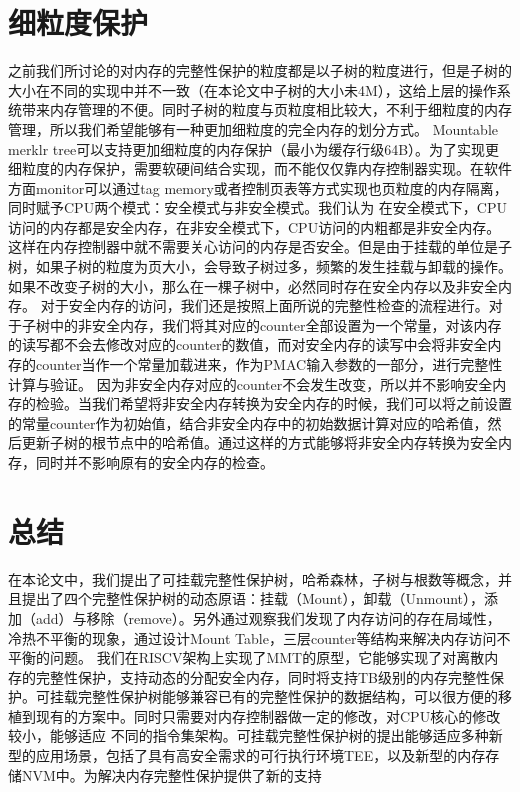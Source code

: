 \section{细粒度保护}
之前我们所讨论的对内存的完整性保护的粒度都是以子树的粒度进行，但是子树的大小在不同的实现中并不一致（在本论文中子树的大小未4M），这给上层的操作系统带来内存管理的不便。同时子树的粒度与页粒度相比较大，不利于细粒度的内存管理，所以我们希望能够有一种更加细粒度的完全内存的划分方式。
Mountable merklr tree可以支持更加细粒度的内存保护（最小为缓存行级64B）。为了实现更细粒度的内存保护，需要软硬间结合实现，而不能仅仅靠内存控制器实现。在软件方面monitor可以通过tag memory或者控制页表等方式实现也页粒度的内存隔离，同时赋予CPU两个模式：安全模式与非安全模式。我们认为
在安全模式下，CPU访问的内存都是安全内存，在非安全模式下，CPU访问的内粗都是非安全内存。这样在内存控制器中就不需要关心访问的内存是否安全。但是由于挂载的单位是子树，如果子树的粒度为页大小，会导致子树过多，频繁的发生挂载与卸载的操作。如果不改变子树的大小，那么在一棵子树中，必然同时存在安全内存以及非安全内存。
对于安全内存的访问，我们还是按照上面所说的完整性检查的流程进行。对于子树中的非安全内存，我们将其对应的counter全部设置为一个常量，对该内存的读写都不会去修改对应的counter的数值，而对安全内存的读写中会将非安全内存的counter当作一个常量加载进来，作为PMAC输入参数的一部分，进行完整性计算与验证。
因为非安全内存对应的counter不会发生改变，所以并不影响安全内存的检验。当我们希望将非安全内存转换为安全内存的时候，我们可以将之前设置的常量counter作为初始值，结合非安全内存中的初始数据计算对应的哈希值，然后更新子树的根节点中的哈希值。通过这样的方式能够将非安全内存转换为安全内存，同时并不影响原有的安全内存的检查。

\section{总结}
在本论文中，我们提出了可挂载完整性保护树，哈希森林，子树与根数等概念，并且提出了四个完整性保护树的动态原语：挂载（Mount），卸载（Unmount），添加（add）与移除（remove）。另外通过观察我们发现了内存访问的存在局域性，冷热不平衡的现象，通过设计Mount Table，三层counter等结构来解决内存访问不平衡的问题。
我们在RISCV架构上实现了MMT的原型，它能够实现了对离散内存的完整性保护，支持动态的分配安全内存，同时将支持TB级别的内存完整性保护。可挂载完整性保护树能够兼容已有的完整性保护的数据结构，可以很方便的移植到现有的方案中。同时只需要对内存控制器做一定的修改，对CPU核心的修改较小，能够适应
不同的指令集架构。可挂载完整性保护树的提出能够适应多种新型的应用场景，包括了具有高安全需求的可行执行环境TEE，以及新型的内存存储NVM中。为解决内存完整性保护提供了新的支持




